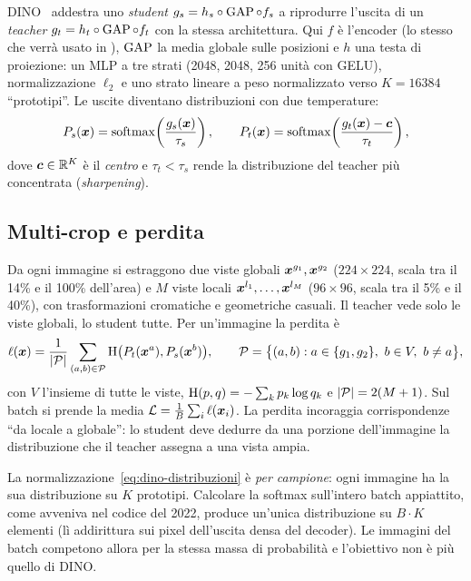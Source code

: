 DINO~\cite{caron2021dino} addestra uno \emph{student} $g_s=h_s\circ\operatorname{GAP}\circ f_s$ a riprodurre
l'uscita di un \emph{teacher} $g_t=h_t\circ\operatorname{GAP}\circ f_t$ con la stessa architettura. Qui $f$ è
l'encoder (lo stesso che verrà usato in \maresunet{}), $\operatorname{GAP}$ la media globale sulle posizioni e
$h$ una testa di proiezione: un MLP a tre strati (2048, 2048, 256 unità con GELU),
normalizzazione $\ell_2$ e uno strato lineare a peso normalizzato verso $K=\num{16384}$
\enquote{prototipi}. Le uscite diventano distribuzioni con due temperature:
\begin{equation}
  P_s(\bm{x})=\operatorname{softmax}\!\left(\frac{g_s(\bm{x})}{\tau_s}\right),\qquad
  P_t(\bm{x})=\operatorname{softmax}\!\left(\frac{g_t(\bm{x})-\bm{c}}{\tau_t}\right),
  \label{eq:dino-distribuzioni}
\end{equation}
dove $\bm{c}\in\mathbb{R}^K$ è il \emph{centro} e $\tau_t<\tau_s$ rende la distribuzione del teacher
più concentrata (\emph{sharpening}).

\subsection{Multi-crop e perdita}

Da ogni immagine si estraggono due viste globali $\bm{x}^{g_1},\bm{x}^{g_2}$ ($224\times224$,
scala tra il 14\% e il 100\% dell'area) e $M$ viste locali $\bm{x}^{l_1},\dots,\bm{x}^{l_M}$
($96\times96$, scala tra il 5\% e il 40\%), con trasformazioni cromatiche e geometriche
casuali. Il teacher vede solo le viste globali, lo student tutte. Per un'immagine la perdita è
\begin{equation}
  \ell(\bm{x})=\frac{1}{\left\lvert \mathcal{P} \right\rvert}\sum_{(a,b)\in\mathcal{P}}
  \mathrm{H}\bigl(P_t(\bm{x}^{a}),P_s(\bm{x}^{b})\bigr),
  \qquad
  \mathcal{P}=\bigl\{(a,b):a\in\{g_1,g_2\},\ b\in V,\ b\neq a\bigr\},
  \label{eq:dino-loss}
\end{equation}
con $V$ l'insieme di tutte le viste, $\mathrm{H}(p,q)=-\sum_kp_k\log q_k$ e
$\left\lvert \mathcal{P} \right\rvert=2(M+1)$. Sul batch si prende la media
$\mathcal{L}=\frac1B\sum_i\ell(\bm{x}_i)$. La perdita incoraggia corrispondenze
\enquote{da locale a globale}: lo student deve dedurre da una porzione dell'immagine la
distribuzione che il teacher assegna a una vista ampia.

\begin{osservazione}
La normalizzazione~\eqref{eq:dino-distribuzioni} è \emph{per campione}: ogni immagine ha la sua
distribuzione su $K$ prototipi. Calcolare la softmax sull'intero batch appiattito, come avveniva
nel codice del 2022, produce un'unica distribuzione su $B\cdot K$ elementi (lì addirittura sui
pixel dell'uscita densa del decoder). Le immagini del batch competono allora per la stessa massa
di probabilità e l'obiettivo non è più quello di DINO.
\end{osservazione}

